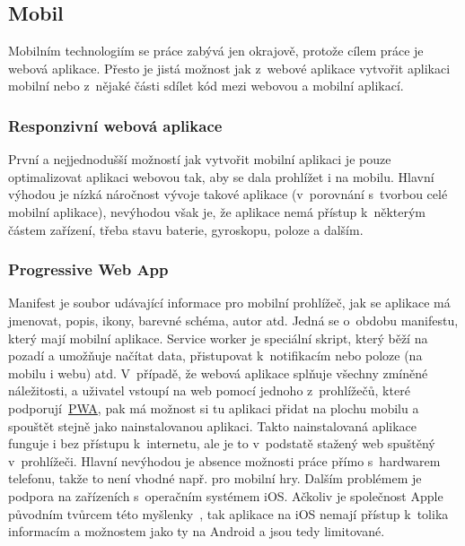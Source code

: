 \subsection{Mobil}
\label{ss:mobile}
Mobilním technologiím se práce zabývá jen okrajově, protože cílem práce je webová aplikace. Přesto je jistá možnost jak z~webové aplikace vytvořit aplikaci mobilní nebo z~nějaké části sdílet kód mezi webovou a mobilní aplikací.

\subsubsection*{Responzivní webová aplikace}
\label{sss:responsive_web_app}
První a nejjednodušší možností jak vytvořit mobilní aplikaci je pouze optimalizovat aplikaci webovou tak, aby se dala prohlížet i na mobilu. Hlavní výhodou je nízká náročnost vývoje takové aplikace (v~porovnání s~tvorbou celé mobilní aplikace), nevýhodou však je, že aplikace nemá přístup k~některým částem zařízení, třeba stavu baterie, gyroskopu, poloze a dalším.

\subsubsection*{Progressive Web App}
\label{sss:pwa}
Manifest je soubor udávající informace pro mobilní prohlížeč, jak se aplikace má jmenovat, popis, ikony, barevné schéma, autor atd. Jedná se o~obdobu manifestu, který mají mobilní aplikace. Service worker je speciální skript, který běží na pozadí a umožňuje načítat data, přistupovat k~notifikacím nebo poloze (na mobilu i webu) atd. V~případě, že webová aplikace splňuje všechny zmíněné náležitosti, a uživatel vstoupí na web pomocí jednoho z~prohlížečů, které podporují~\hyperref[sss:pwa]{PWA}, pak má možnost si tu aplikaci přidat na plochu mobilu a spouštět stejně jako nainstalovanou aplikaci. Takto nainstalovaná aplikace funguje i bez přístupu k~internetu, ale je to v~podstatě stažený web spuštěný v~prohlížeči. Hlavní nevýhodou je absence možnosti práce přímo s~hardwarem telefonu, takže to není vhodné např. pro mobilní hry. Dalším problémem je podpora na zařízeních s~operačním systémem iOS. Ačkoliv je společnost Apple původním tvůrcem této myšlenky~\cite{ritchie_2018_app}, tak aplikace na iOS nemají přístup k~tolika informacím a možnostem jako ty na Android a jsou tedy limitované.

